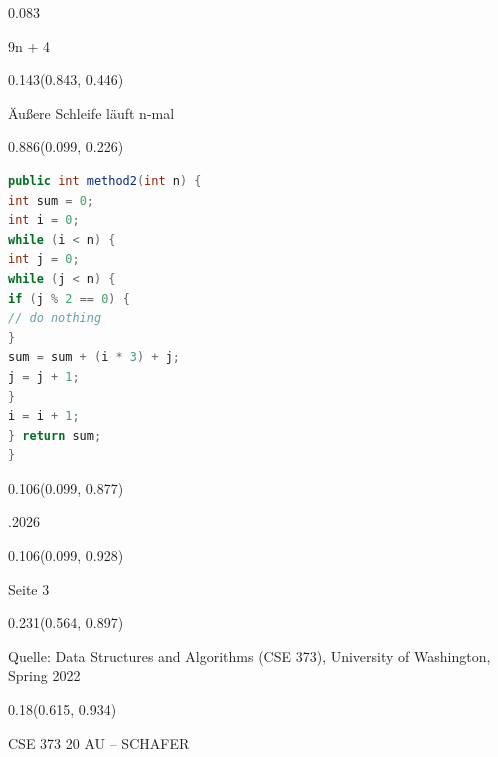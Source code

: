 \documentclass[aspectratio=169]{beamer}
\begin{document}
\begin{frame}[fragile]
\begin{textblock}{0.083}
\begin{minipage}[t][0.044\paperheight]{\linewidth}
    {\tiny 9n + 4}
  \end{minipage}
\end{textblock}
\begin{textblock}{0.143}(0.843, 0.446)
  \begin{minipage}[t][0.094\paperheight]{\linewidth}
    {\tiny Äußere Schleife läuft n-mal}
  \end{minipage}
\end{textblock}
\begin{textblock}{0.886}(0.099, 0.226)
  \begin{minipage}[t][0.63\paperheight]{\linewidth}
    \begin{lstlisting}[language=Java, basicstyle=\ttfamily\scriptsize]
public int method2(int n) {
int sum = 0;
int i = 0;
while (i < n) {
int j = 0;
while (j < n) {
if (j % 2 == 0) {
// do nothing
}
sum = sum + (i * 3) + j;
j = j + 1;
}
i = i + 1;
} return sum;
}
    \end{lstlisting}
  \end{minipage}
\end{textblock}
\begin{textblock}{0.106}(0.099, 0.877)
  \begin{minipage}[b][0.026\paperheight]{\linewidth}
    \raggedright
    \fontsize{3}{3.3}.2026
  \end{minipage}
\end{textblock}
\begin{textblock}{0.106}(0.099, 0.928)
  \begin{minipage}[b][0.031\paperheight]{\linewidth}
    \raggedright
    \fontsize{3}{3.3}\selectfont Seite 3
  \end{minipage}
\end{textblock}
\begin{textblock}{0.231}(0.564, 0.897)
  \begin{minipage}[b][0.032\paperheight]{\linewidth}
    \raggedright
    \fontsize{3}{3.3}\selectfont Quelle: Data Structures and Algorithms (CSE 373), University of Washington, Spring 2022
  \end{minipage}
\end{textblock}
\begin{textblock}{0.18}(0.615, 0.934)
  \begin{minipage}[b][0.032\paperheight]{\linewidth}
    \raggedright
    \fontsize{3}{3.3}\selectfont CSE 373 20 AU – SCHAFER
  \end{minipage}
\end{textblock}
\end{frame}
\end{document}
